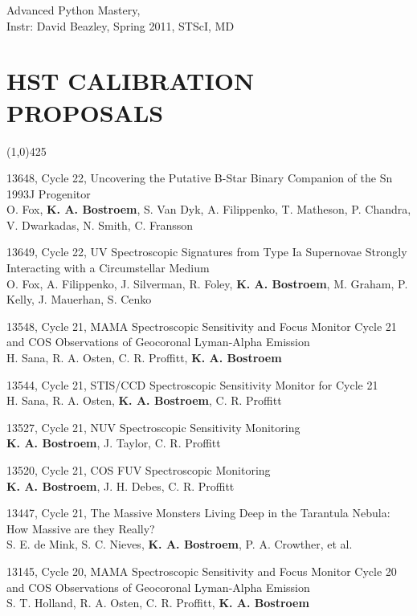 \documentclass{res}
\begin{document}
\begin{resume}
Advanced Python Mastery, \\
Instr: David Beazley, Spring 2011, STScI, MD

\section{HST CALIBRATION PROPOSALS}
\vspace{-.2in} 
\begin{center}
\line(1,0){425}
\end{center}
\vspace{-.25in} 
\vspace{0.1in}

13648, Cycle 22, Uncovering the Putative B-Star Binary Companion of the Sn 1993J Progenitor\\
O. Fox, {\bf K. A. Bostroem}, S. Van Dyk, A. Filippenko, T. Matheson, P. Chandra, V. Dwarkadas, N. Smith, C. Fransson 

13649, Cycle 22, UV Spectroscopic Signatures from Type Ia Supernovae Strongly Interacting with a Circumstellar Medium \\
O. Fox, A. Filippenko, J. Silverman, R. Foley, {\bf K. A. Bostroem}, M. Graham, P. Kelly, J. Mauerhan, S. Cenko

13548, Cycle 21, MAMA Spectroscopic Sensitivity and Focus Monitor Cycle 21 and COS Observations of Geocoronal Lyman-Alpha Emission \\
H. Sana, R. A. Osten, C. R. Proffitt, {\bf K. A. Bostroem}

13544, Cycle 21, STIS/CCD Spectroscopic Sensitivity Monitor for Cycle 21 \\
H. Sana, R. A. Osten, {\bf K. A. Bostroem}, C. R. Proffitt

13527, Cycle 21, NUV Spectroscopic Sensitivity Monitoring \\
{\bf K. A. Bostroem}, J. Taylor, C. R. Proffitt

13520, Cycle 21, COS FUV Spectroscopic Monitoring \\
{\bf K. A. Bostroem}, J. H. Debes, C. R. Proffitt

13447, Cycle 21, The Massive Monsters Living Deep in the Tarantula Nebula: How Massive are they Really? \\
S. E. de Mink, S. C. Nieves, {\bf K. A. Bostroem}, P. A. Crowther, et al.

13145, Cycle 20, MAMA Spectroscopic Sensitivity and Focus Monitor Cycle 20 and COS Observations of Geocoronal Lyman-Alpha Emission \\
S. T. Holland, R. A. Osten, C. R. Proffitt, {\bf K. A. Bostroem}


\end{resume}
\end{document}
